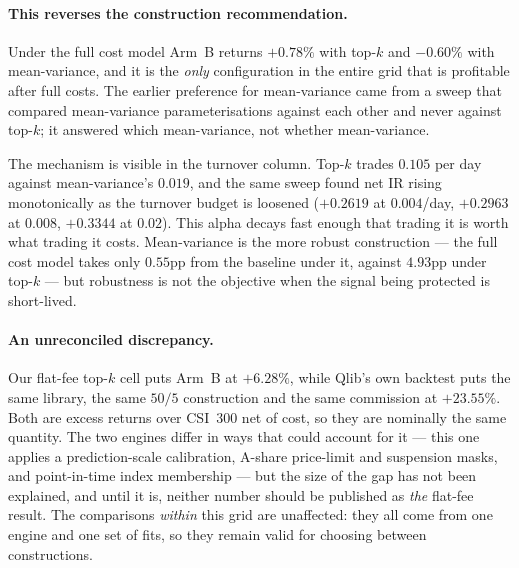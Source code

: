 \documentclass[11pt,a4paper]{article}
\begin{document}
\begin{table}[h]\centering
\caption{Net ARR. Flat fee is $\kappa_0$ alone; full adds slippage, impact and
borrow.}
\end{table}

\begin{table}[h]\centering
\caption{Book turnover. Top-$k$ is structurally pinned at $n_{\mathrm{drop}}/k$;
mean-variance spends its budget.}
\end{table}

\paragraph{This reverses the construction recommendation.}
Under the full cost model Arm~B returns $+0.78\%$ with top-$k$ and $-0.60\%$
with mean-variance, and it is the \emph{only} configuration in the entire grid
that is profitable after full costs. The earlier preference for mean-variance
came from a sweep that compared mean-variance parameterisations against each
other and never against top-$k$; it answered which mean-variance, not whether
mean-variance.

The mechanism is visible in the turnover column. Top-$k$ trades $0.105$ per day
against mean-variance's $0.019$, and the same sweep found net IR rising
monotonically as the turnover budget is loosened ($+0.2619$ at $0.004$/day,
$+0.2963$ at $0.008$, $+0.3344$ at $0.02$). This alpha decays fast enough that
trading it is worth what trading it costs. Mean-variance is the more robust
construction --- the full cost model takes only $0.55$pp from the baseline under
it, against $4.93$pp under top-$k$ --- but robustness is not the objective when
the signal being protected is short-lived.

\paragraph{An unreconciled discrepancy.}
Our flat-fee top-$k$ cell puts Arm~B at $+6.28\%$, while Qlib's own backtest
puts the same library, the same $50/5$ construction and the same commission at
$+23.55\%$. Both are excess returns over CSI~300 net of cost, so they are
nominally the same quantity. The two engines differ in ways that could account
for it --- this one applies a prediction-scale calibration, A-share price-limit
and suspension masks, and point-in-time index membership --- but the size of the
gap has not been explained, and until it is, neither number should be published
as \emph{the} flat-fee result. The comparisons \emph{within} this grid are
unaffected: they all come from one engine and one set of fits, so they remain
valid for choosing between constructions.
\end{document}
